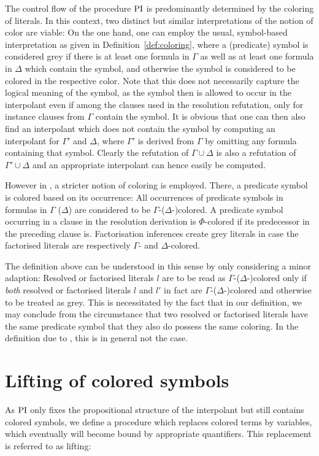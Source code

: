 \begin{remark}
	The control flow of the procedure $\operatorname{PI}$ is predominantly determined by the coloring of literals.
	In this context, two distinct but similar interpretations of the notion of color are viable: 
	On the one hand, one can employ the usual, symbol-based interpretation as given in Definition~\ref{def:coloring}, where a (predicate) symbol is considered grey if there is at least one formula in $\Gamma$ as well as at least one formula in $\Delta$ which contain the symbol, and otherwise the symbol is considered to be colored in the respective color. 
	Note that this does not necessarily capture the logical meaning of the symbol, as the symbol then is allowed to occur in the interpolant even if among the clauses used in the resolution refutation, only for instance clauses from $\Gamma$ contain the symbol.
	It is obvious that one can then also find an interpolant which does not contain the symbol by computing an interpolant for $\Gamma'$ and $\Delta$, where $\Gamma'$ is derived from $\Gamma$ by omitting any formula containing that symbol. 
	Clearly the refutation of $\Gamma \cup \Delta$ is also a refutation of $\Gamma' \cup \Delta$ and an appropriate interpolant can hence easily be computed.

	However in \cite{Huang95}, a stricter notion of coloring is employed.
	There, a predicate symbol is colored based on its occurrence:
	All occurrences of predicate symbols in formulas in $\Gamma$ ($\Delta$) are considered to be $\Gamma$-($\Delta$-)colored.
	A predicate symbol occurring in a clause in the resolution derivation is $\Phi$-colored if its predecessor in the preceding clause is.
	Factorisation inferences create grey literals in case the factorised literals are respectively $\Gamma$- and $\Delta$-colored.

	The definition above can be understood in this sense by only considering a minor adaption:
	Resolved or factorised literals $l$ are to be read as $\Gamma$-($\Delta$-)colored only if \emph{both} resolved or factorised literals $l$ and $l'$ in fact are $\Gamma$-($\Delta$-)colored and otherwise to be treated as grey. 
	This is necessitated by the fact that in our definition, we may conclude from the circumstance that two resolved or factorised literals have the same predicate symbol that they also do possess the same coloring.
	In the definition due to \cite{Huang95}, this is in general not the case.
\end{remark}


\section{Lifting of colored symbols}
\label{sec:lifting}
As $\operatorname{PI}$ only fixes the propositional structure of the interpolant but still contains colored symbols, 
we define a procedure which replaces colored terms by variables, which eventually will become bound by appropriate quantifiers.
This replacement is referred to as lifting:


